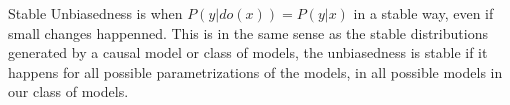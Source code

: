 Stable Unbiasedness is when $P(y|do(x)) = P(y|x)$ in a stable way, even if small changes happenned. This is in the same sense as the stable distributions generated by a causal model or class of models, the unbiasedness is stable if it happens for all possible parametrizations of the models, in all possible models in our class of models.


